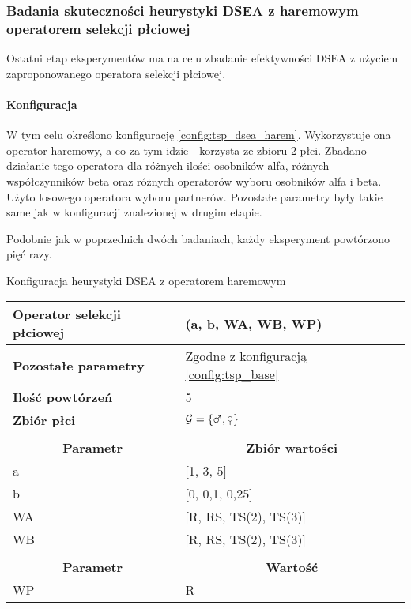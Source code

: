 \documentclass[./FM_mgr.tex]{subfiles}
\begin{document}
\subsubsection{Badania skuteczności heurystyki DSEA z haremowym operatorem selekcji płciowej}

Ostatni etap eksperymentów ma na celu zbadanie efektywności DSEA z użyciem zaproponowanego operatora selekcji płciowej.

\paragraph{Konfiguracja} W tym celu określono konfigurację \ref{config:tsp_dsea_harem}.
Wykorzystuje ona operator haremowy, a co za tym idzie - korzysta ze zbioru 2 płci.
Zbadano działanie tego operatora dla różnych ilości osobników alfa, różnych współczynników beta oraz różnych operatorów wyboru osobników alfa i beta.
Użyto losowego operatora wyboru partnerów.
Pozostałe parametry były takie same jak w konfiguracji znalezionej w drugim etapie.

Podobnie jak w poprzednich dwóch badaniach, każdy eksperyment powtórzono pięć razy.

\begin{config}
	\caption{Konfiguracja heurystyki DSEA z operatorem haremowym \label{config:tsp_dsea_harem}}
	\begin{tabularx}{\linewidth}{lX}
		\hline
		\multicolumn{1}{|l|}{{\bf Operator selekcji płciowej}} &
		\multicolumn{1}{l|}{\opName{harem}(a, b, WA, WB, WP)} \\ 
		\hline
		\multicolumn{1}{|l|}{{\bf Pozostałe parametry}} &
		\multicolumn{1}{l|}{Zgodne z konfiguracją \ref{config:tsp_base}} \\ 
		\hline
		\multicolumn{1}{|l|}{{\bf Ilość powtórzeń}} &
		\multicolumn{1}{l|}{5} \\ 
		\hline
		\multicolumn{1}{|l|}{{\bf Zbiór płci}} & 
		\multicolumn{1}{l|}{$\important{G} = \{ \male, \female \}$} \\ 
		\hline
		& \\ 
		\hline
		\multicolumn{1}{|c|}{{\bf Parametr}} & 
		\multicolumn{1}{c|}{{\bf Zbiór wartości}} \\ 
		\hline \hline
		\multicolumn{1}{|l|}{a} & 
		\multicolumn{1}{l|}{{[}1, 3, 5{]}} \\ 
		\hline
		\multicolumn{1}{|l|}{b} & 
		\multicolumn{1}{l|}{[0, 0,1, 0,25]} \\ 
		\hline
		\multicolumn{1}{|l|}{WA} & 
		\multicolumn{1}{l|}{[R, RS, TS(2), TS(3)]} \\ 
		\hline
		\multicolumn{1}{|l|}{WB} & 
		\multicolumn{1}{l|}{[R, RS, TS(2), TS(3)]} \\ 
		\hline
		& \\ 
		\hline
		\multicolumn{1}{|c|}{{\bf Parametr}} & 
		\multicolumn{1}{c|}{{\bf Wartość}} \\ 
		\hline \hline
		\multicolumn{1}{|l|}{WP} &
		\multicolumn{1}{l|}{R} \\ 
		\hline
	\end{tabularx}
\end{config}
\end{document}

